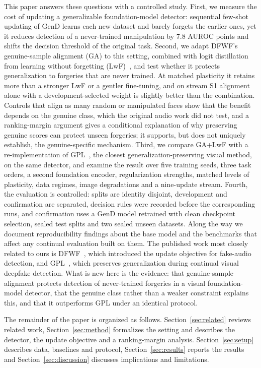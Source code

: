 \documentclass{ieeeaccess}
\begin{document}
This paper answers these questions with a controlled study. First, we measure the cost of updating a generalizable foundation-model detector: sequential few-shot updating of GenD learns each new dataset and barely forgets the earlier ones, yet it reduces detection of a never-trained manipulation by 7.8 AUROC points and shifts the decision threshold of the original task. Second, we adapt DFWF's genuine-sample alignment (GA) to this setting, combined with logit distillation from learning without forgetting (LwF)~\cite{li2018lwf}, and test whether it protects generalization to forgeries that are never trained. At matched plasticity it retains more than a stronger LwF or a gentler fine-tuning, and on stream S1 alignment alone with a development-selected weight is slightly better than the combination. Controls that align as many random or manipulated faces show that the benefit depends on the genuine class, which the original audio work did not test, and a ranking-margin argument gives a conditional explanation of why preserving genuine scores can protect unseen forgeries; it supports, but does not uniquely establish, the genuine-specific mechanism. Third, we compare GA+LwF with a re-implementation of GPL~\cite{zhang2025gpl}, the closest generalization-preserving visual method, on the same detector, and examine the result over five training seeds, three task orders, a second foundation encoder, regularization strengths, matched levels of plasticity, data regimes, image degradations and a nine-update stream. Fourth, the evaluation is controlled: splits are identity disjoint, development and confirmation are separated, decision rules were recorded before the corresponding runs, and confirmation uses a GenD model retrained with clean checkpoint selection, sealed test splits and two sealed unseen datasets. Along the way we document reproducibility findings about the base model and the benchmarks that affect any continual evaluation built on them. The published work most closely related to ours is DFWF~\cite{ma2021dfwf}, which introduced the update objective for fake-audio detection, and GPL~\cite{zhang2025gpl}, which preserves generalization during continual visual deepfake detection. What is new here is the evidence: that genuine-sample alignment protects detection of never-trained forgeries in a visual foundation-model detector, that the genuine class rather than a weaker constraint explains this, and that it outperforms GPL under an identical protocol.

The remainder of the paper is organized as follows. Section~\ref{sec:related} reviews related work, Section~\ref{sec:method} formalizes the setting and describes the detector, the update objective and a ranking-margin analysis. Section~\ref{sec:setup} describes data, baselines and protocol, Section~\ref{sec:results} reports the results and Section~\ref{sec:discussion} discusses implications and limitations.
\end{document}
